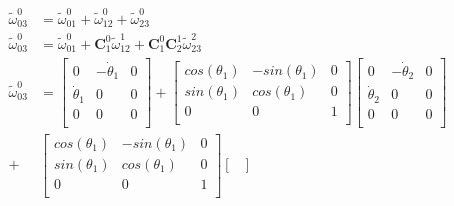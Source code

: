 \documentclass[12pt,letterpaper, onecolumn]{exam}
\begin{document}
\begin{questions}
\begin{parts}
\begin{subparts}
{                \begin{equation}
                    \begin{split}
                        \tilde{\omega}^0_{03} & = \tilde{\omega}^0_{01} + \tilde{\omega}^0_{12} + \tilde{\omega}^0_{23}\\
                        \tilde{\omega}^0_{03} & = \tilde{\omega}^0_{01} + \mathbf{C}^0_1\tilde{\omega}^1_{12} + \mathbf{C}^0_1\mathbf{C}^1_2\tilde{\omega}^2_{23}\\
                        \tilde{\omega}^0_{03} & =
                        \begin{bmatrix}
                            0              & -\dot{\theta}_1 & 0 \\
                            \dot{\theta}_1 & 0               & 0 \\
                            0              & 0               & 0 \\
                        \end{bmatrix} +
                        \begin{bmatrix}
                            cos(\theta_1) & -sin(\theta_1) & 0 \\
                            sin(\theta_1) & cos(\theta_1)  & 0 \\
                            0             & 0              & 1 \\
                        \end{bmatrix}
                        \begin{bmatrix}
                            0              & -\dot{\theta}_2 & 0 \\
                            \dot{\theta}_2 & 0               & 0 \\
                            0              & 0               & 0 \\
                        \end{bmatrix}\\
                        + &
                        \begin{bmatrix}
                            cos(\theta_1) & -sin(\theta_1) & 0 \\
                            sin(\theta_1) & cos(\theta_1)  & 0 \\
                            0             & 0              & 1 \\
                        \end{bmatrix}
                        \begin{bmatrix}

\end{bmatrix}
\end{split}
\end{equation}}
\end{subparts}
\end{parts}
\end{questions}
\end{document}
